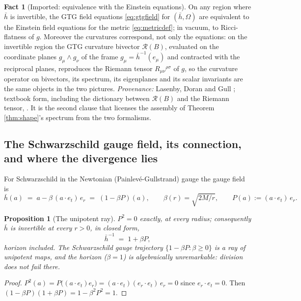 \documentclass[11pt]{article}
\newtheorem{proposition}[theorem]{Proposition}
\theoremstyle{definition}
\newtheorem{fact}[theorem]{Fact}
\newcommand{\hb}{\bar{h}}
\newcommand{\er}{e_r}
\newcommand{\et}{e_t}
\begin{document}
\begin{fact}[Imported: equivalence with the Einstein equations]\label{fact:gtgequiv}
On any region where $\hb$ is invertible, the GTG field equations \eqref{eq:gtgfield} for $(\hb, \Omega)$ are equivalent to the Einstein field equations for the metric \eqref{eq:metricdef}; in vacuum, to Ricci-flatness of $g$. Moreover the curvatures correspond, not only the equations: on the invertible region the GTG curvature bivector $\mathcal{R}(B)$, evaluated on the coordinate planes $g_\mu \wedge g_\nu$ of the frame $g_\mu = \hb^{-1}(e_\mu)$ and contracted with the reciprocal planes, reproduces the Riemann tensor $R_{\mu\nu}{}^{\rho\sigma}$ of $g$, so the curvature operator on bivectors, its spectrum, its eigenplanes and its scalar invariants are the same objects in the two pictures. \emph{Provenance:} Lasenby, Doran and Gull \cite[\S 7]{LDG1998}; textbook form, including the dictionary between $\mathcal{R}(B)$ and the Riemann tensor, \cite[Ch.~13-14]{DoranLasenby2003}. It is the second clause that licenses the assembly of Theorem \ref{thm:shape}'s spectrum from the two formalisms.
\end{fact}

\subsection{The Schwarzschild gauge field, its connection, and where the divergence lies}\label{subsec:solution}

For Schwarzschild in the Newtonian (Painlev\'e-Gullstrand) gauge the gauge field is
\begin{equation}\label{eq:hbar}
\hb(a) \;=\; a - \beta\,(a \cdot \et)\,\er \;=\; (1 - \beta P)(a), \qquad \beta(r) = \sqrt{2M/r}, \qquad P(a) := (a \cdot \et)\,\er .
\end{equation}

\begin{proposition}[The unipotent ray]\label{prop:unipotent}
$P^2 = 0$ exactly, at every radius; consequently $\hb$ is invertible at every $r > 0$, in closed form,
\[
\hb^{-1} \;=\; 1 + \beta P ,
\]
horizon included. The Schwarzschild gauge trajectory $\{1 - \beta P : \beta \geq 0\}$ is a ray of unipotent maps, and the horizon ($\beta = 1$) is algebraically unremarkable: division does not fail there.
\end{proposition}

\begin{proof}
$P^2(a) = P\bigl((a\cdot\et)\er\bigr) = (a\cdot\et)(\er\cdot\et)\,\er = 0$ since $\er \cdot \et = 0$. Then $(1 - \beta P)(1 + \beta P) = 1 - \beta^2 P^2 = 1$.
\end{proof}
\end{document}
